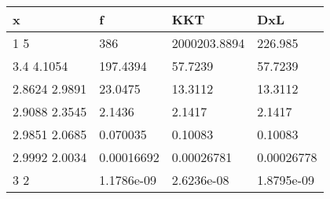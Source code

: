 \begin{tabular}{llll}
x & f & KKT & DxL \\ 
\hline 
1  5 & 386 & 2000203.8894 & 226.985 \\ 
3.4      4.1054 & 197.4394 & 57.7239 & 57.7239 \\ 
2.8624      2.9891 & 23.0475 & 13.3112 & 13.3112 \\ 
2.9088      2.3545 & 2.1436 & 2.1417 & 2.1417 \\ 
2.9851      2.0685 & 0.070035 & 0.10083 & 0.10083 \\ 
2.9992      2.0034 & 0.00016692 & 0.00026781 & 0.00026778 \\ 
3           2 & 1.1786e-09 & 2.6236e-08 & 1.8795e-09 \\ 
\hline 
\end{tabular}